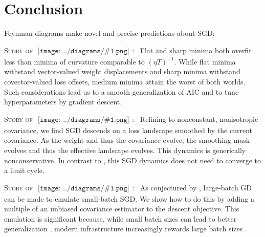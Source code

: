 \documentclass{article}
\newcommand{\sdia}[1]{\begin{gathered}\texttt{[image: ../diagrams/\#1.png]}\end{gathered}}
\begin{document}
\section{Conclusion}


    Feynman diagrams make novel and precise predictions about SGD: 

        \textsc{Story of $\sdia{c(01-2)(02-12)}$:~}
        Flat and sharp minima both overfit less than minima of curvature
        comparable to $(\eta T)^{-1}$.  While flat minima withstand
        vector-valued weight displacements and sharp minima withstand
        covector-valued loss offsets, medium minima attain the worst of both
        worlds.  Such considerations lead us to a smooth generalization of AIC
        and to tune hyperparameters by gradient descent.

        \textsc{Story of $\sdia{c(01-2-3)(02-12-23)}$:~}
        Refining \citet{we19b} to nonconstant, nonisotropic covariance, we find
        SGD descends on a loss landscape smoothed by the current covariance.
        As the weight and thus the covariance evolve, the smoothing mask
        evolves and thus the effective landscape evolves.  This dynamics
        is generically nonconservative.  In contrast to \citet{ch18}, this SGD
        dynamics does not need to converge to a limit cycle. 

        \textsc{Story of $\sdia{c(01-2)(01-12)}$:~}
        As conjectured by \citet{ro18}, large-batch GD can be made to emulate
        small-batch SGD.  We show how to do this by adding a multiple of an
        unbiased covariance estimator to the descent objective.  This emulation
        is significant because, while small batch sizes can lead to better
        generalization \citep{bo91}, modern infrastructure increasingly rewards
        large batch sizes \citep{go18}.  

\end{document}
